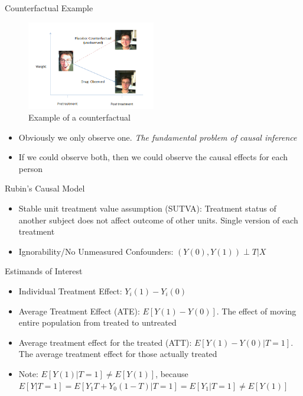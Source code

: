   
\begin{frame}{Counterfactual Example}
   \begin{figure}[h!]
  \centering
    \includegraphics[width=0.5\textwidth]{counterfactual.png}
    \caption{Example of a counterfactual}
\label{fig:counterfactual}
\end{figure}

\begin{itemize}
 \item Obviously we only observe one. \textit{The fundamental problem of causal inference}
\item If we could observe both, then we could observe the causal effects for each person
\end{itemize}
\end{frame}

\begin{frame}{Rubin's Causal Model}
\begin{itemize}
\item Stable unit treatment value assumption (SUTVA): Treatment status of another subject does not affect outcome of other units. Single version of each treatment
\item Ignorability/No Unmeasured Confounders: $(Y(0),Y(1))\perp T|X$
\end{itemize}
\end{frame}




\begin{frame}{Estimands of Interest}
 \begin{itemize}
 \item Individual Treatment Effect: $Y_i(1)-Y_i(0)$
 \item Average Treatment Effect (ATE): $E[Y(1)-Y(0)]$. The effect of moving entire population
 from treated to untreated
 \item Average treatment effect for the treated (ATT): $E[Y(1)-Y(0)|T=1]$. The average treatment
 effect for those actually treated
 \item Note:  $E[Y(1)|T=1]\neq E[Y(1)]$, because $E[Y|T=1]=E[Y_1T+Y_0(1-T)|T=1]=E[Y_1|T=1]\neq E[Y(1)]$
\end{itemize}
 
\end{frame}


